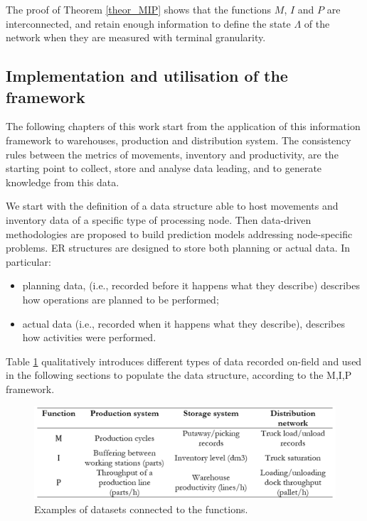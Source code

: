 The proof of Theorem \ref{theor_MIP} shows that the functions $M$, $I$ and $P$ are interconnected, and retain enough information to define the state $\Lambda$ of the network when they are measured with terminal granularity. 

\subsection{Implementation and utilisation of the framework}
The following chapters of this work start from the application of this information framework to warehouses, production and distribution system. The consistency rules between the metrics of movements, inventory and productivity, are the starting point to collect, store and analyse data leading, and to generate knowledge from this data.\par

We start with the definition of a data structure able to host movements and inventory data of a specific type of processing node. Then data-driven methodologies are proposed to build prediction models addressing node-specific problems. ER structures are designed to store both planning or actual data. In particular:

\begin{itemize}
    \item planning data, (i.e., recorded before it happens what they describe) describes how operations are planned to be performed;
    \item actual data (i.e., recorded when it happens what they describe), describes how activities were performed.
\end{itemize}

Table \ref{tab_MIPinLS} qualitatively introduces different types of data recorded on-field and used in the following sections to populate the data structure, according to the M,I,P framework.

\begin{figure}[hbt!]
\centering
\includegraphics[width=1\textwidth]{SectionIntroduction/informationFramework_figures/tab_MIPinLS.png}
\captionsetup{type=table}
\caption{Examples of datasets connected to the functions.}
\label{tab_MIPinLS}
\end{figure}

\clearpage



